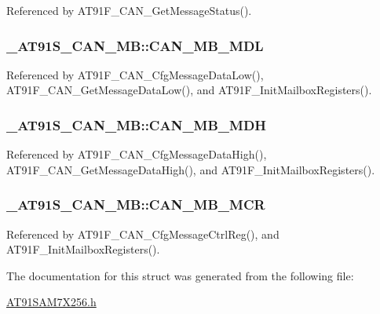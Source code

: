 Referenced by AT91F\_\-CAN\_\-GetMessageStatus().\hypertarget{struct__AT91S__CAN__MB_bfd3dd6c614553af6371be7018ebb091}{
\subsubsection{ {\bf \_\-AT91S\_\-CAN\_\-MB::CAN\_\-MB\_\-MDL}}}
\label{struct__AT91S__CAN__MB_bfd3dd6c614553af6371be7018ebb091}




Referenced by AT91F\_\-CAN\_\-CfgMessageDataLow(), AT91F\_\-CAN\_\-GetMessageDataLow(), and AT91F\_\-InitMailboxRegisters().\hypertarget{struct__AT91S__CAN__MB_7d39aa4dea8601f47177334d7083332e}{
\subsubsection{ {\bf \_\-AT91S\_\-CAN\_\-MB::CAN\_\-MB\_\-MDH}}}
\label{struct__AT91S__CAN__MB_7d39aa4dea8601f47177334d7083332e}




Referenced by AT91F\_\-CAN\_\-CfgMessageDataHigh(), AT91F\_\-CAN\_\-GetMessageDataHigh(), and AT91F\_\-InitMailboxRegisters().\hypertarget{struct__AT91S__CAN__MB_f51897a132563a5f01cbeef42467bab2}{
\subsubsection{ {\bf \_\-AT91S\_\-CAN\_\-MB::CAN\_\-MB\_\-MCR}}}
\label{struct__AT91S__CAN__MB_f51897a132563a5f01cbeef42467bab2}




Referenced by AT91F\_\-CAN\_\-CfgMessageCtrlReg(), and AT91F\_\-InitMailboxRegisters().

The documentation for this struct was generated from the following file:\begin{CompactItemize}
\item 
\hyperlink{AT91SAM7X256_8h}{AT91SAM7X256.h}\end{CompactItemize}
